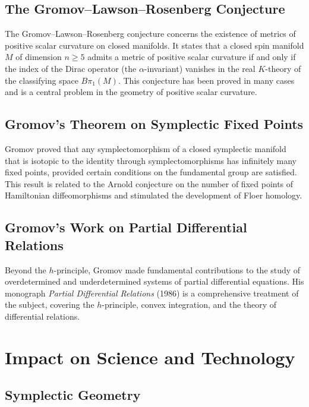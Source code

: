 \subsection{The Gromov--Lawson--Rosenberg Conjecture}

The Gromov--Lawson--Rosenberg conjecture concerns the existence of metrics of positive scalar curvature on closed manifolds. It states that a closed spin manifold \(M\) of dimension \(n \geq 5\) admits a metric of positive scalar curvature if and only if the index of the Dirac operator (the \(\alpha\)-invariant) vanishes in the real \(K\)-theory of the classifying space \(B\pi_1(M)\). This conjecture has been proved in many cases and is a central problem in the geometry of positive scalar curvature.

\subsection{Gromov's Theorem on Symplectic Fixed Points}

Gromov proved that any symplectomorphism of a closed symplectic manifold that is isotopic to the identity through symplectomorphisms has infinitely many fixed points, provided certain conditions on the fundamental group are satisfied. This result is related to the Arnold conjecture on the number of fixed points of Hamiltonian diffeomorphisms and stimulated the development of Floer homology.

\subsection{Gromov's Work on Partial Differential Relations}

Beyond the \(h\)-principle, Gromov made fundamental contributions to the study of overdetermined and underdetermined systems of partial differential equations. His monograph \textit{Partial Differential Relations} (1986) is a comprehensive treatment of the subject, covering the \(h\)-principle, convex integration, and the theory of differential relations.

\section{Impact on Science and Technology}

\subsection{Symplectic Geometry}

